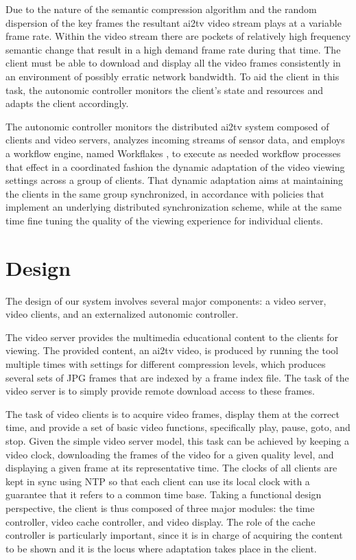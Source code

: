 \documentclass{sig-alternate}
\begin{document}
Due to the nature of the semantic compression algorithm and the random
dispersion of the key frames the resultant ai2tv video stream plays at
a variable frame rate.  Within the video stream there are pockets of
relatively high frequency semantic change that result in a high demand
frame rate during that time.  The client must be able to download and
display all the video frames consistently in an environment of
possibly erratic network bandwidth.  To aid the client in this task,
the autonomic controller monitors the client's state and resources and
adapts the client accordingly.

The autonomic controller monitors the distributed ai2tv system
composed of clients and video servers, analyzes incoming streams of
sensor data, and employs a workflow engine, named Workflakes
\cite{PEPPO}, to execute as needed workflow processes that effect in a
coordinated fashion the dynamic adaptation of the video viewing
settings across a group of clients.  That dynamic adaptation aims at
maintaining the clients in the same group synchronized, in accordance
with policies that implement an underlying distributed synchronization
scheme, while at the same time fine tuning the quality of the viewing
experience for individual clients.

\section{Design} \label{design}

The design of our system involves several major components: a video
server, video clients, and an externalized autonomic controller.

%

The video server provides the multimedia educational content to the
clients for viewing.  The provided content, an ai2tv video, is
produced by running the tool multiple times with settings for
different compression levels, which produces several sets of JPG
frames that are indexed by a frame index file.  The task of the video
server is to simply provide remote download access to these frames.

The task of video clients is to acquire video frames, display them at
the correct time, and provide a set of basic video functions,
specifically play, pause, goto, and stop.  Given the simple video
server model, this task can be achieved by keeping a video clock,
downloading the frames of the video for a given quality level, and
displaying a given frame at its representative time.  The clocks of
all clients are kept in sync using NTP \cite{NTP} so that each client
can use its local clock with a guarantee that it refers to a common
time base. Taking a functional design perspective, the client is thus
composed of three major modules: the time controller, video cache
controller, and video display. The role of the cache controller is
particularly important, since it is in charge of acquiring the content
to be shown and it is the locus where adaptation takes place in the
client.
\end{document}
